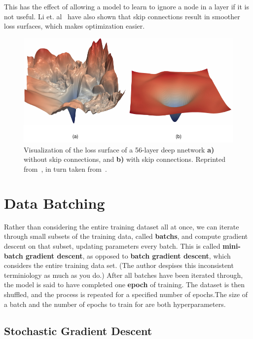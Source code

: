 \documentclass[12pt]{report}
\theoremstyle{definition}
\theoremstyle{remark}
\begin{document}
This has the effect of allowing a model to learn to ignore a node in a layer if it is not useful. Li et. al~\cite{li_visualizing_2018} have also shown that skip connections result in smoother loss surfaces, which makes optimization easier.
\begin{figure}[h]
    \centering
    \includegraphics[width=\linewidth]{figs/smooth.pdf}
    \caption{Visualization of the loss surface of a 56-layer deep nnetwork \textbf{a)} without skip connections, and \textbf{b)} with skip connections. Reprinted from~\cite{bishop_deep_2023}, in turn taken from~\cite{li_visualizing_2018}.}
    \label{fig:residual-loss-surface}
\end{figure}

\section{Data Batching}

Rather than considering the entire training dataset all at once, we can iterate through small subsets of the training data, called \textbf{\glspl{batch}}, and compute gradient descent on that subset, updating parameters every batch. This is called \textbf{mini-batch gradient descent}, as opposed to \textbf{batch gradient descent}, which considers the entire training data set. (The author despises this inconsistent terminiology as much as you do.) After all batches have been iterated through, the model is said to have completed one \textbf{epoch} of training. The dataset is then shuffled, and the process is repeated for a specified number of epochs.The size of a batch and the number of epochs to train for are both hyperparameters.


\subsection{Stochastic Gradient Descent}
\end{document}
